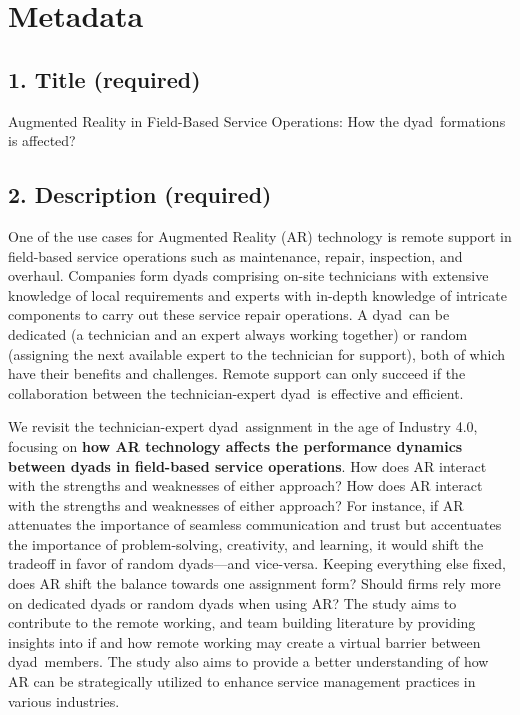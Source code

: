 \documentclass[A4,11pt]{article}
\renewcommand{\~}[1]{\tilde{#1}}
\renewcommand{\-}[1]{\overline{#1}}
\newcommand{\dyad}{dyad}
\begin{document}

\section*{Metadata}

\subsection*{1. Title (required) }
Augmented Reality in Field-Based Service Operations: How the \dyad\ formations is affected?

\subsection*{2. Description (required) }
One of the use cases for Augmented Reality (AR) technology is remote support in field-based service operations such as maintenance, repair, inspection, and overhaul. Companies form \dyad s comprising on-site technicians with extensive knowledge of local requirements and experts with in-depth knowledge of intricate components to carry out these service repair operations. A \dyad\ can be dedicated (a technician and an expert always working together) or random (assigning the next available expert to the technician for support), both of which have their benefits and challenges. Remote support can only succeed if the collaboration between the technician-expert \dyad\ is effective and efficient.

We revisit the technician-expert \dyad\ assignment in the age of Industry 4.0, focusing on \textbf{how AR technology affects the performance dynamics between \dyad s in field-based service operations}. How does AR interact with the strengths and weaknesses of either approach? How does AR interact with the strengths and weaknesses of either approach? For instance, if AR attenuates the importance of seamless communication and trust but accentuates the importance of problem-solving, creativity, and learning, it would shift the tradeoff in favor of random \dyad s---and vice-versa. Keeping everything else fixed, does AR shift the balance towards one assignment form? Should firms rely more on dedicated \dyad s or random \dyad s when using AR? The study aims to contribute to the remote working, and team building literature by providing insights into if and how remote working may create a virtual barrier between \dyad\ members. The study also aims to provide a better understanding of how AR can be strategically utilized to enhance service management practices in various industries.
\end{document}
